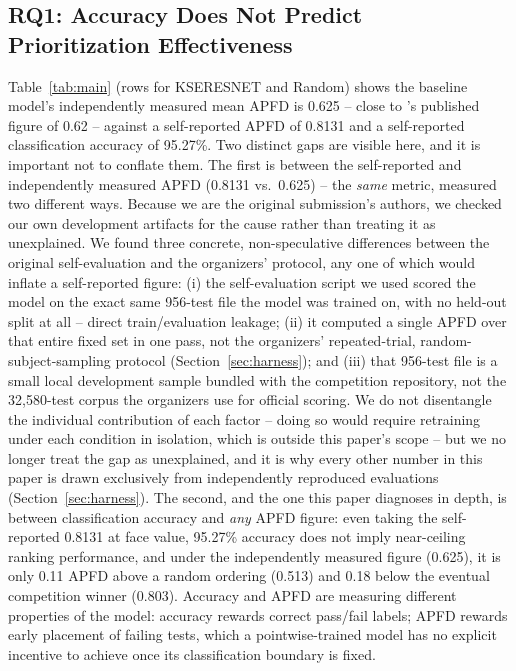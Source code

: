\documentclass[smallextended]{svjour3}
\begin{document}
\subsection{RQ1: Accuracy Does Not Predict Prioritization Effectiveness}
\label{sec:rq1}
Table~\ref{tab:main} (rows for KSERESNET and Random) shows the baseline
model's independently measured mean APFD is 0.625 -- close to
\citeauthor{aryan2026icst}'s published figure of 0.62 -- against a
self-reported APFD of 0.8131 and a self-reported classification accuracy of
95.27\%. Two distinct gaps are visible here, and it is important not to
conflate them. The first is between the self-reported and independently
measured APFD (0.8131 vs.\ 0.625) -- the \emph{same} metric, measured two
different ways. Because we are the original submission's authors, we
checked our own development artifacts for the cause rather than treating
it as unexplained. We found three concrete, non-speculative differences
between the original self-evaluation and the organizers' protocol, any one
of which would inflate a self-reported figure: (i) the self-evaluation
script we used scored the model on the exact same 956-test file the model
was trained on, with no held-out split at all -- direct train/evaluation
leakage; (ii) it computed a single APFD over that entire fixed set in one
pass, not the organizers' repeated-trial, random-subject-sampling protocol
(Section~\ref{sec:harness}); and (iii) that 956-test file is a small local
development sample bundled with the competition repository, not the
32{,}580-test corpus the organizers use for official scoring. We do not
disentangle the individual contribution of each factor -- doing so would
require retraining under each condition in isolation, which is outside
this paper's scope -- but we no longer treat the gap as unexplained, and
it is why every other number in this paper is drawn exclusively from
independently reproduced evaluations (Section~\ref{sec:harness}). The
second, and the one this paper diagnoses
in depth, is between classification accuracy and \emph{any} APFD figure:
even taking the self-reported 0.8131 at face value, 95.27\% accuracy does
not imply near-ceiling ranking performance, and under the independently
measured figure (0.625), it is only 0.11 APFD above a random ordering
(0.513) and 0.18 below the eventual competition winner (0.803). Accuracy
and APFD
are measuring different properties of the model: accuracy rewards correct
pass/fail labels; APFD rewards early placement of failing tests, which a
pointwise-trained model has no explicit incentive to
achieve once its classification boundary is fixed.
\end{document}
